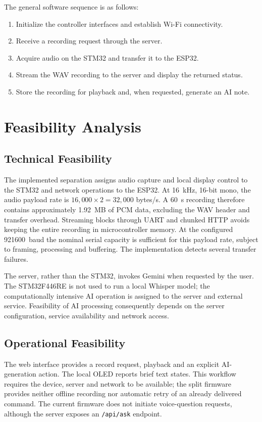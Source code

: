 \documentclass[a4paper,12pt,oneside]{report}
\begin{document}
The general software sequence is as follows:
\begin{enumerate}
\item Initialize the controller interfaces and establish Wi-Fi connectivity.
\item Receive a recording request through the server.
\item Acquire audio on the STM32 and transfer it to the ESP32.
\item Stream the WAV recording to the server and display the returned status.
\item Store the recording for playback and, when requested, generate an AI note.
\end{enumerate}

\section{Feasibility Analysis}
\subsection{Technical Feasibility}
The implemented separation assigns audio capture and local display control to the STM32 and network operations to the ESP32. At 16~kHz, 16-bit mono, the audio payload rate is $16{,}000\times 2=32{,}000$ bytes/s. A 60~s recording therefore contains approximately 1.92~MB of PCM data, excluding the WAV header and transfer overhead. Streaming blocks through UART and chunked HTTP avoids keeping the entire recording in microcontroller memory. At the configured 921600~baud the nominal serial capacity is sufficient for this payload rate, subject to framing, processing and buffering. The implementation detects several transfer failures.

The server, rather than the STM32, invokes Gemini when requested by the user. The STM32F446RE is not used to run a local Whisper model; the computationally intensive AI operation is assigned to the server and external service. Feasibility of AI processing consequently depends on the server configuration, service availability and network access.

\subsection{Operational Feasibility}
The web interface provides a record request, playback and an explicit AI-generation action. The local OLED reports brief text states. This workflow requires the device, server and network to be available; the split firmware provides neither offline recording nor automatic retry of an already delivered command. The current firmware does not initiate voice-question requests, although the server exposes an \texttt{/api/ask} endpoint.
\end{document}

